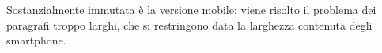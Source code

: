 Sostanzialmente immutata è la versione mobile: viene risolto il problema dei paragrafi troppo larghi, che si restringono data la larghezza contenuta degli smartphone.